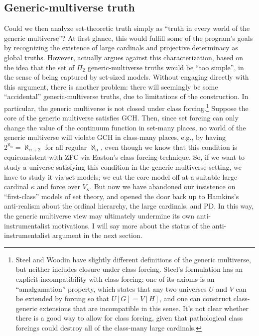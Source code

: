 \documentclass[letterpaper,12pt]{article}
\begin{document}
\subsection{Generic-multiverse truth}
Could we then analyze set-theoretic truth simply as ``truth in every world of the generic multiverse''? At first glance, this would fulfill some of the program's goals by recognizing the existence of large cardinals and projective determinacy as global truths. However, \cite{woodin2009continuum} actually argues against this characterization, based on the idea that the set of $\Pi_2$ generic-multiverse truths would be ``too simple'', in the sense of being captured by set-sized models. Without engaging directly with this argument, there is another problem: there will seemingly be some ``accidental'' generic-multiverse truths, due to limitations of the construction. In particular, the generic multiverse is not closed under class forcing.\footnote{Steel and Woodin have slightly different definitions of the generic multiverse, but neither includes closure under class forcing. Steel's formulation has an explicit incompatibility with class forcing: one of its axioms is an ``amalgamation'' property, which states that any two universes $U$ and $V$ can be extended by forcing so that $U[G] = V[H]$, and one can construct class-generic extensions that are incompatible in this sense. It's not clear whether there is a good way to allow for class forcing, given that pathological class forcings could destroy all of the class-many large cardinals.} Suppose the core of the generic multiverse satisfies GCH. Then, since set forcing can only change the value of the continuum function in set-many places, no world of the generic multiverse will violate GCH in class-many places, e.g., by having $2^{\aleph_\alpha} = \aleph_{\alpha + 2}$ for all regular $\aleph_\alpha$, even though we know that this condition is equiconsistent with ZFC via Easton's class forcing technique. So, if we want to study a universe satisfying this condition in the generic multiverse setting, we have to study it via set models; we cut the core model off at a suitable large cardinal $\kappa$ and force over $V_\kappa$. But now we have abandoned our insistence on ``first-class'' models of set theory, and opened the door back up to Hamkins's anti-realism about the ordinal hierarchy, the large cardinals, and PD. In this way, the generic multiverse view may ultimately undermine its own anti-instrumentalist motivations. I will say more about the status of the anti-instrumentalist argument in the next section.
\end{document}
